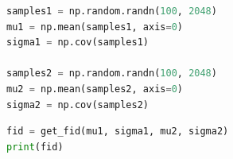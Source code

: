 \begin{lstlisting}[language=Python]
samples1 = np.random.randn(100, 2048)
mu1 = np.mean(samples1, axis=0)
sigma1 = np.cov(samples1)

samples2 = np.random.randn(100, 2048)
mu2 = np.mean(samples2, axis=0)
sigma2 = np.cov(samples2)
\end{lstlisting}

\begin{lstlisting}[language=Python]
fid = get_fid(mu1, sigma1, mu2, sigma2)
print(fid)
\end{lstlisting}
